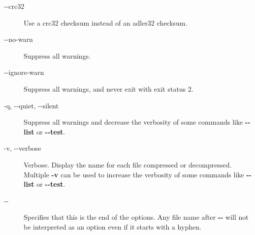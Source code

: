 \begin{description}
\item[{-{}-crc32}] \mbox{}

Use a crc32 checksum instead of an adler32 checksum.


\item[{-{}-no-warn}] \mbox{}

Suppress all warnings.


\item[{-{}-ignore-warn}] \mbox{}

Suppress all warnings, and never exit with exit status 2.


\item[{-q, -{}-quiet, -{}-silent}] \mbox{}

Suppress all warnings and decrease the verbosity of some
commands like \textbf{-{}-list} or \textbf{-{}-test}.


\item[{-v, -{}-verbose}] \mbox{}

Verbose. Display the name for each file compressed
or decompressed. Multiple \textbf{-v} can be used to increase
the verbosity of some commands like \textbf{-{}-list} or \textbf{-{}-test}.


\item[{-{}-}] \mbox{}

Specifies that this is the end of the options. Any file name
after \textbf{-{}-} will not be interpreted as an option even if
it starts with a hyphen.

\end{description}
